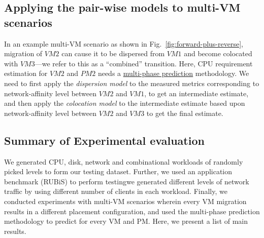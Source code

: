 \subsection{Applying the pair-wise models to multi-VM scenarios}
In an example multi-VM scenario as shown in Fig.~\ref{fig:forward-plus-reverse},
migration of $VM2$ can cause it to be dispersed from $VM1$
and become colocated with $VM3$---we refer to this 
as a ``combined'' transition.
Here, CPU requirement estimation for $VM2$ and $PM2$ needs a
\underline{multi-phase prediction} methodology.
We need to first apply the \textit{dispersion model} to the
measured metrics corresponding to network-affinity level between $VM2$
and $VM1$, to get an intermediate estimate, and then apply the
\textit{colocation model} to the intermediate estimate
based upon network-affinity level
between $VM2$ and $VM3$ to get the final estimate.

\vspace{-0.1in}
\subsection{Summary of Experimental evaluation}
We generated CPU, disk, network and combinational workloads of
randomly picked levels to form our testing dataset.
Further, we used an application benchmark (RUBiS) to
perform testing\textemdash{}we generated different
levels of network traffic by using different number
of clients in each workload. Finally, we conducted
experiments with multi-VM scenarios wherein every
VM migration results in a different placement configuration,
and used the multi-phase prediction methodology 
to predict for every VM and PM.
Here, we present a list of main results. %

